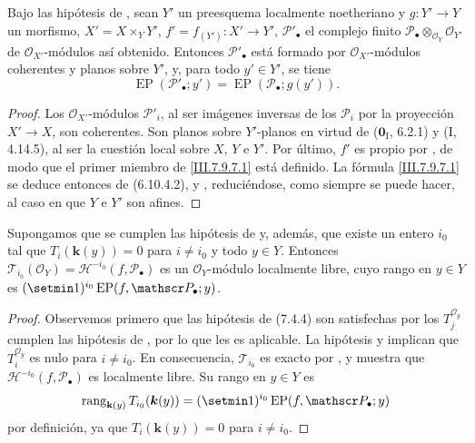 \begin{proposition}[7.9.7]
\label{III.7.9.7}
\label{III.7.9.7.fr}
Bajo las hipótesis de \textup{}, sean $Y'$ un preesquema
localmente noetheriano y $g:Y'\to Y$ un morfismo, $X'=X\times_Y Y'$, $f'=f_{(Y')}:X'\to Y'$,
$\mathscr P'_\bullet$ el complejo finito
$\mathscr P_\bullet\otimes_{\mathscr O_Y}\mathscr O_{Y'}$
de $\mathscr O_{X'}$-módulos así obtenido.
Entonces $\mathscr P'_\bullet$ está formado por
$\mathscr O_{X'}$-módulos coherentes y planos sobre $Y'$, y, para
todo $y'\in Y'$, se tiene
\[
  \operatorname{EP}(\mathscr P'_\bullet;y')
  =\operatorname{EP}(\mathscr P_\bullet;g(y')).
  \tag{7.9.7.1}\label{III.7.9.7.1.fr}
\]
\end{proposition}

\begin{proof}
Los $\mathscr O_{X'}$-módulos $\mathscr P'_i$, al ser imágenes
inversas de los $\mathscr P_i$ por la proyección $X'\to X$, son
coherentes. Son planos sobre $Y'$-planos en
virtud de ($\mathbf{0}_{\mathrm I}$, 6.2.1) y (I, 4.14.5), al ser la cuestión local sobre
$X$, $Y$ e $Y'$. Por último, $f'$ es propio por
, de modo que el primer miembro de
\eqref{III.7.9.7.1} está definido. La fórmula
\eqref{III.7.9.7.1} se deduce entonces de
\textup{(6.10.4.2)},  y
, reduciéndose, como siempre se puede hacer, al
caso en que $Y$ e $Y'$ son afines.
\end{proof}

\begin{proposition}[7.9.8]
\label{III.7.9.8}
\label{III.7.9.8.fr}
Supongamos que se cumplen las hipótesis de \textup{} y,
además, que existe un entero $i_0$ tal que $T_i(\boldsymbol{k}(y))=0$ para $i\ne i_0$ y todo $y\in Y$.
Entonces $\mathscr T_{i_0}(\mathscr O_Y)=\mathscr H^{-i_0}(f,\mathscr P_\bullet)$
es un $\mathscr O_Y$-módulo localmente libre, cuyo rango en
$y\in Y$ es
$(\setmin 1)^{i_0}\operatorname{EP}(f,\mathscr P_\bullet;y)$.
\end{proposition}

\begin{proof}
Observemos primero que las hipótesis de (7.4.4) son satisfechas por los $T_j^{\mathscr O_y}$ cumplen las hipótesis de
, por lo que  les es aplicable.
La hipótesis y  implican que
$T_i^{\mathscr O_y}$ es nulo para $i\ne i_0$.
En consecuencia, $\mathscr T_{i_0}$ es exacto por
, y  muestra que
$\mathscr H^{-i_0}(f,\mathscr P_\bullet)$ es localmente libre.
Su rango en $y\in Y$ es
\[
  \operatorname{rang}_{\mathbf{k}(y)}
  T_{i_0}(\boldsymbol{k}(y))
  =(\setmin 1)^{i_0}\operatorname{EP}(f,\mathscr P_\bullet;y)
\]
por definición, ya que $T_i(\boldsymbol{k}(y))=0$ para
$i\ne i_0$.
\end{proof}

